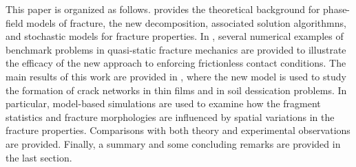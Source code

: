 This paper is organized as follows.  provides the theoretical background for phase-field models of fracture, the new decomposition, associated solution algorithmns, and stochastic models for fracture properties.  In , several numerical examples of benchmark problems in quasi-static fracture mechanics are provided to illustrate the efficacy of the new approach to enforcing frictionless contact conditions.  The main results of this work are provided in , where the new model is used to study the formation of crack networks in thin films and in soil dessication problems.  In particular, model-based simulations are used to examine how the fragment statistics and fracture morphologies are influenced by spatial variations in the fracture properties.  Comparisons with both theory and experimental observations are provided.  Finally, a summary and some concluding remarks are provided in the last section.
